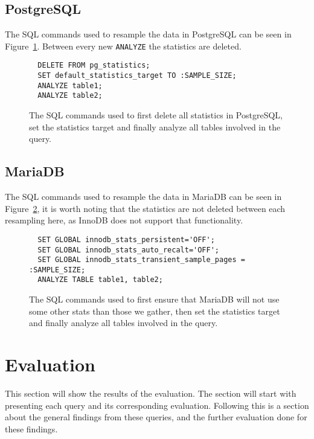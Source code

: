 \subsection{PostgreSQL}
The SQL commands used to resample the data in PostgreSQL can be seen in
Figure~\ref{fig:sql:pganalyze}. Between every new \texttt{ANALYZE} the statistics
are deleted.

\begin{figure}[ht]
\begin{verbatim}
  DELETE FROM pg_statistics;
  SET default_statistics_target TO :SAMPLE_SIZE;
  ANALYZE table1;
  ANALYZE table2;
\end{verbatim}
\caption[The SQL commands used to resample inPostgreSQL.]{The SQL commands used
  to first delete all statistics in PostgreSQL, set the statistics target and
  finally analyze all tables involved in the query.}
\label{fig:sql:pganalyze}
\end{figure}

\subsection{MariaDB}
The SQL commands used to resample the data in MariaDB can be seen in
Figure~\ref{fig:sql:resamplemdb}, it is worth noting that the statistics are not
deleted between each resampling here, as InnoDB does not support that functionality.

\begin{figure}[ht]
\begin{verbatim}
  SET GLOBAL innodb_stats_persistent='OFF';
  SET GLOBAL innodb_stats_auto_recalt='OFF';
  SET GLOBAL innodb_stats_transient_sample_pages = :SAMPLE_SIZE;
  ANALYZE TABLE table1, table2;
\end{verbatim}
\caption[The SQL commands used to resample in MariaDB.]{The SQL commands used to
first ensure that MariaDB will not use some other stats than those we gather,
then set the statistics target and finally analyze all tables involved in the query.}
\label{fig:sql:resamplemdb}
\end{figure}

\section{Evaluation}
This section will show the results of the evaluation. The section will start
with presenting each query and its corresponding evaluation. Following this is a
section about the general findings from these queries, and the further
evaluation done for these findings.

